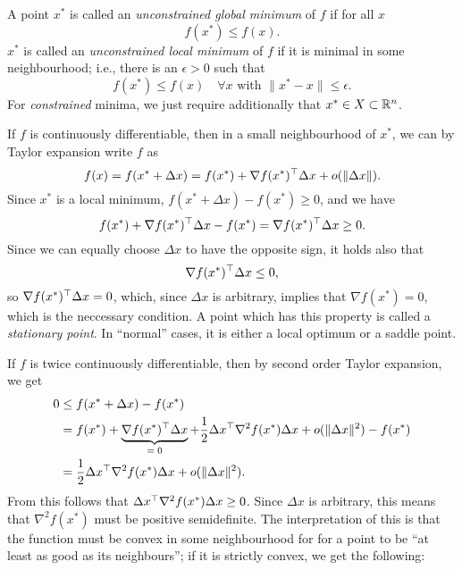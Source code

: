 \documentclass{article}
\begin{document}

A point \(x^*\) is called an \emph{unconstrained global minimum} of \(f\) if for all \(x\)
\begin{equation*}
  f(x^*) \leq f(x).
\end{equation*}
\(x^*\) is called an \emph{unconstrained local minimum} of \(f\) if it is minimal in some
neighbourhood; i.e., there is an \(\epsilon > 0\) such that
\begin{equation*}
  f(x^*) \leq f(x) \quad \forall x \text{ with } \lVert x^* - x \rVert \leq \epsilon.
\end{equation*}
For \emph{constrained} minima, we just require additionally that \(x^* \in X \subset \mathbb{R}^n\).



If \(f\) is continuously differentiable, then in a small neighbourhood of \(x^*\), we can by Taylor
expansion write \(f\) as
\begin{equation*}
  f(x) = f(x^* + \Delta x) = f(x^*) + \nabla f(x^*)^{\top} \Delta x + o(\lVert \Delta x \rVert).
\end{equation*}
Since \(x^*\) is a local minimum, \(f(x^* + \Delta x) - f(x^*) \geq 0\), and we have
\begin{equation*}
  f(x^*) + \nabla f(x^*)^{\top} \Delta x - f(x^*) = \nabla f(x^*)^{\top} \Delta x \geq 0.
\end{equation*}
Since we can equally choose \(\Delta x\) to have the opposite sign, it holds also that
\begin{equation*}
  \nabla f(x^*)^{\top} \Delta x \leq 0,
\end{equation*}
so \(\nabla f(x^*)^{\top} \Delta x = 0\), which, since \(\Delta x\) is arbitrary, implies that
\(\nabla f(x^*) = 0\), which is the neccessary condition. A point which has this property is called
a \emph{stationary point}.  In ``normal'' cases, it is either a local optimum or a saddle point.



If \(f\) is twice continuously differentiable, then by second order Taylor expansion, we get
\begin{align*}
  0 &\leq f(x^* + \Delta x) - f(x^*) \\
    &= f(x^*) + \underbrace{\nabla f(x^*)^{\top} \Delta x}_{=\; 0} +
      \frac{1}{2} \Delta x^{\top} \nabla^2 f(x^*) \Delta x + o(\lVert \Delta x \rVert^2) - f(x^*) \\
    &=  \frac{1}{2} \Delta x^{\top} \nabla^2 f(x^*) \Delta x + o(\lVert \Delta x \rVert^2).
\end{align*}
From this follows that \(\Delta x^{\top} \nabla^2 f(x^*) \Delta x \geq 0\).  Since \(\Delta x\) is
arbitrary, this means that \(\nabla^2 f(x^*)\) must be positive semidefinite.  The interpretation of
this is that the function must be convex in some neighbourhood for for a point to be ``at least as
good as its neighbours''; if it is strictly convex, we get the following:
\end{document}

